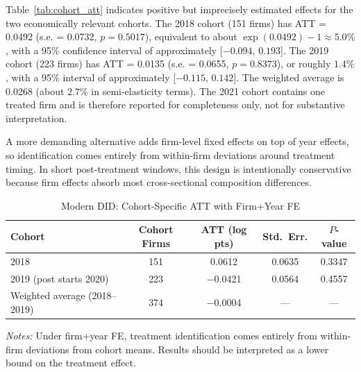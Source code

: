 Table~\ref{tab:cohort_att} indicates positive but imprecisely estimated effects for the two economically relevant cohorts. The 2018 cohort (151 firms) has ATT = 0.0492 (s.e. = 0.0732, $p = 0.5017$), equivalent to about $\exp(0.0492)-1 \approx 5.0\%$, with a 95\% confidence interval of approximately [$-0.094$, $0.193$]. The 2019 cohort (223 firms) has ATT = 0.0135 (s.e. = 0.0655, $p = 0.8373$), or roughly $1.4\%$, with a 95\% interval of approximately [$-0.115$, $0.142$]. The weighted average is 0.0268 (about $2.7\%$ in semi-elasticity terms). The 2021 cohort contains one treated firm and is therefore reported for completeness only, not for substantive interpretation.

A more demanding alternative adds firm-level fixed effects on top of year effects, so identification comes entirely from within-firm deviations around treatment timing. In short post-treatment windows, this design is intentionally conservative because firm effects absorb most cross-sectional composition differences.

\begin{table}[htbp]
\centering
\caption{Modern DID: Cohort-Specific ATT with Firm+Year FE}
\label{tab:cohort_att_firm}
\small
\begin{tabular}{lcccc}
\toprule
\textbf{Cohort} & \textbf{Cohort Firms} & \textbf{ATT (log pts)} & \textbf{Std.\ Err.} & \textbf{$P$-value} \\
\midrule
2018 & 151 & 0.0612 & 0.0635 & 0.3347 \\
2019 (post starts 2020) & 223 & $-$0.0421 & 0.0564 & 0.4557 \\
Weighted average (2018--2019) & 374 & $-$0.0004 & --- & --- \\
\bottomrule
\end{tabular}
\begin{tablenotes}
\small
\item \textit{Notes:} Under firm+year FE, treatment identification comes entirely from within-firm deviations from cohort means. Results should be interpreted as a lower bound on the treatment effect.
\end{tablenotes}
\end{table}

